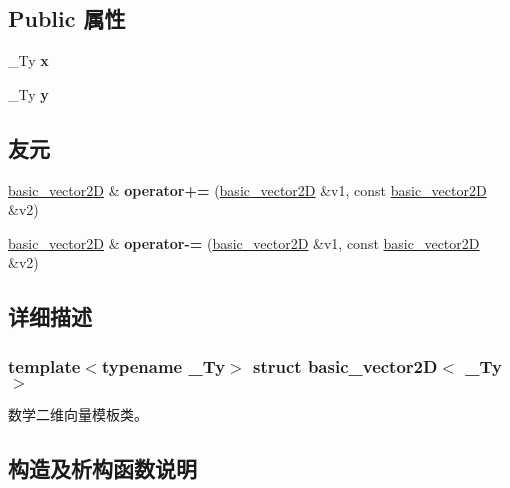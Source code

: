 \subsection*{Public 属性}
\begin{DoxyCompactItemize}
\item 
\mbox{\label{structbasic__vector2_d_a9f606d50a5993d8c8f3834e67e2e750d}} 
\+\_\+\+Ty {\bfseries x}
\item 
\mbox{\label{structbasic__vector2_d_ad874ba527147096c9ee6c56ded52be73}} 
\+\_\+\+Ty {\bfseries y}
\end{DoxyCompactItemize}
\subsection*{友元}
\begin{DoxyCompactItemize}
\item 
\mbox{\label{structbasic__vector2_d_adb9aa08ea9517ddbfd6d610e270a1a0e}} 
\hyperlink{structbasic__vector2_d}{basic\+\_\+vector2D} \& {\bfseries operator+=} (\hyperlink{structbasic__vector2_d}{basic\+\_\+vector2D} \&v1, const \hyperlink{structbasic__vector2_d}{basic\+\_\+vector2D} \&v2)
\item 
\mbox{\label{structbasic__vector2_d_a840973b019d576292fcfbb982e351314}} 
\hyperlink{structbasic__vector2_d}{basic\+\_\+vector2D} \& {\bfseries operator-\/=} (\hyperlink{structbasic__vector2_d}{basic\+\_\+vector2D} \&v1, const \hyperlink{structbasic__vector2_d}{basic\+\_\+vector2D} \&v2)
\end{DoxyCompactItemize}


\subsection{详细描述}
\subsubsection*{template$<$typename \+\_\+\+Ty$>$\newline
struct basic\+\_\+vector2\+D$<$ \+\_\+\+Ty $>$}

数学二维向量模板类。 



\subsection{构造及析构函数说明}
\mbox{\label{structbasic__vector2_d_ad8b15c63d5ad6e86e1192ff820f53a67}} 
